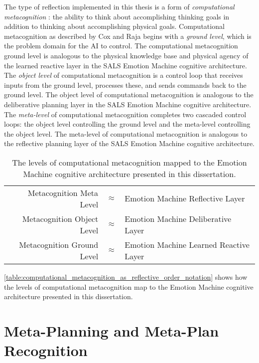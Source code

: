 The type of reflection implemented in this thesis is a form of
{\emph{computational metacognition}}
\cite[]{cox_and_raja:2008,cox:2010}: the ability to think about
accomplishing thinking goals in addition to thinking about
accomplishing physical goals.  Computational metacognition as
described by Cox and Raja begins with a {\emph{ground level}}, which
is the problem domain for the AI to control.  The computational
metacognition ground level is analogous to the physical knowledge base
and physical agency of the learned reactive layer in the SALS Emotion
Machine cognitive architecture.  The {\emph{object level}} of
computational metacognition is a control loop that receives inputs
from the ground level, processes these, and sends commands back to the
ground level.  The object level of computational metacognition is
analogous to the deliberative planning layer in the SALS Emotion
Machine cognitive architecture.  The {\emph{meta-level}} of
computational metacognition completes two cascaded control loops: the
object level controlling the ground level and the meta-level
controlling the object level.  The meta-level of computational
metacognition is analogous to the reflective planning layer of the
SALS Emotion Machine cognitive architecture.
\begin{table}
\begin{tabular}{|rll|}
\hline
Metacognition Meta Level   &${\approx}$ &Emotion Machine Reflective Layer \\
Metacognition Object Level &${\approx}$ &Emotion Machine Deliberative Layer \\
Metacognition Ground Level &${\approx}$ &Emotion Machine Learned Reactive Layer \\
\hline
\end{tabular}
\caption{The levels of computational metacognition mapped to the
  Emotion Machine cognitive architecture presented in this
  dissertation.}
\label{table:computational_metacognition_as_reflective_order_notation}
\end{table}
\autoref{table:computational_metacognition_as_reflective_order_notation}
shows how the levels of computational metacognition map to the Emotion
Machine cognitive architecture presented in this dissertation.

\section{Meta-Planning and Meta-Plan Recognition}
\label{section:meta_planning_and_meta_plan_recognition}

